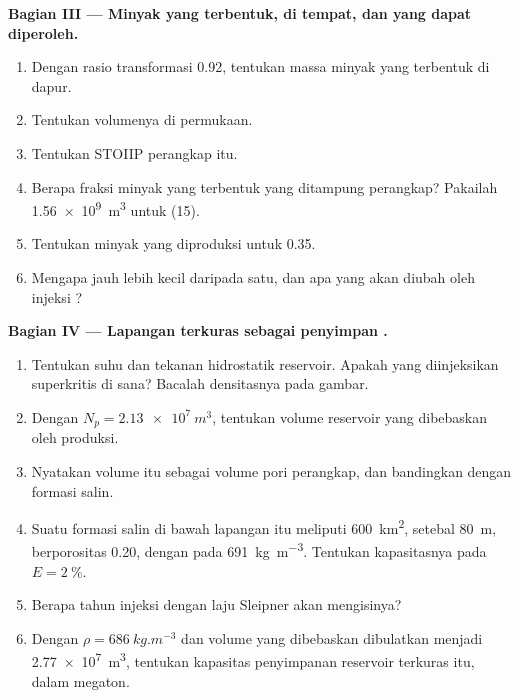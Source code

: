 \begin{problem}
\noindent\textbf{Bagian III --- Minyak yang terbentuk, di tempat, dan yang dapat diperoleh.}
\begin{enumerate}[resume]
  \item Dengan rasio transformasi 0.92, tentukan massa minyak yang terbentuk di dapur.
  \item Tentukan volumenya di permukaan.
  \item Tentukan STOIIP perangkap itu.
  \item Berapa fraksi minyak yang terbentuk yang ditampung perangkap? Pakailah \qty{1.56e9}{m^3} untuk (15).
  \item Tentukan minyak yang diproduksi untuk  0.35.
  \item Mengapa  jauh lebih kecil daripada satu, dan apa yang akan diubah oleh injeksi ?
\end{enumerate}

\noindent\textbf{Bagian IV --- Lapangan terkuras sebagai penyimpan .}
\begin{enumerate}[resume]
  \item Tentukan suhu dan tekanan hidrostatik reservoir. Apakah  yang diinjeksikan
        superkritis di sana? Bacalah densitasnya pada gambar.
  \item Dengan $N_p = \qty{2.13e7}{m^3}$, tentukan volume reservoir yang dibebaskan oleh produksi.
  \item Nyatakan volume itu sebagai  volume pori perangkap, dan bandingkan dengan
        formasi salin.
  \item Suatu formasi salin di bawah lapangan itu meliputi \qty{600}{km^2}, setebal \qty{80}{m},
        berporositas 0.20, dengan  pada \qty{691}{kg.m^{-3}}. Tentukan kapasitasnya pada $E =
        \qty{2}{\percent}$.
  \item Berapa tahun injeksi dengan laju Sleipner akan mengisinya?
  \item Dengan $\rho = \qty{686}{kg.m^{-3}}$ dan volume yang dibebaskan dibulatkan menjadi \qty{2.77e7}{m^3}, tentukan
        kapasitas penyimpanan  reservoir terkuras itu, dalam megaton.
\end{enumerate}
\end{problem}

